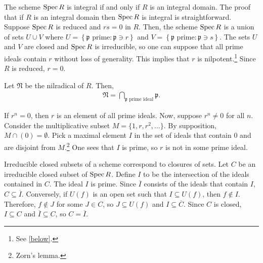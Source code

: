\documentclass [11 pt, oneside] {article}
\begin{document}
The scheme $\operatorname{Spec} R$ is integral if and only if $R$ is an integral domain. The proof that if $R$ is an integral domain then $\operatorname{Spec} R$ is integral is straightforward. Suppose $\operatorname{Spec} R$ is reduced and $rs=0$ in $R$. Then, the scheme $\operatorname{Spec} R$ is a union of sets $U\cup V$ where $U = \left\{ \textrm{$\mathfrak{p}$ prime}: \mathfrak{p}\ni r \right\} $ and $V = \left\{\textrm{$\mathfrak{p}$ prime}: \mathfrak{p} \ni s \right\}$. The sets $U$ and $V$ are closed and $\operatorname{Spec} R$ is irreducible, so one can suppose that all prime ideals contain $r$ without loss of generality. This implies that $r$ is nilpotent.\footnote{See \cref{below}.} Since $R$ is reduced, $r=0$.
\begin{proposition}[ ]\label{below}\text{}
Let $\mathfrak{N}$ be the nilradical of $R$. Then,
\begin{align*}
	\mathfrak{N} = \bigcap_{\textrm{$\mathfrak{p}$ prime ideal}} \mathfrak{p}.
\end{align*}
\end{proposition}
\begin{esquisse}
	If $r^n =0$, then $r$ is an element of all prime ideals. Now, suppose $r^n\ne 0$ for all $n$. Consider the multiplicative subset $M = \{1,r,r^2,\hdots\}$. By supposition, $M\cap (0)=\emptyset$. Pick a maximal element $I$ in the set of ideals that contain $0$ and are disjoint from $M$.\footnote{Zorn's lemma.} One sees that $I$ is prime, so $r$ is not in some prime ideal.
\end{esquisse}

Irreducible closed subsets of a scheme correspond to closures of sets. Let $C$ be an irreducible closed subset of $\operatorname{Spec} R$. Define $I$ to be the intersection of the ideals contained in $C$. The ideal $I$ is prime. Since $\overline{I}$ consists of the ideals that contain $I$, $C\subseteq \overline{I}$. Conversely, if $U(f)$ is an open set such that $I\subseteq U(f)$, then $f\notin I$. Therefore, $f\notin J$ for some $J\in C$, so $J\subseteq U(f)$ and $I\subseteq \overline{C}$. Since $C$ is closed, $I\subseteq C$ and $\overline{I}\subseteq C$, so $C=\overline{I}$.
\end{document}
